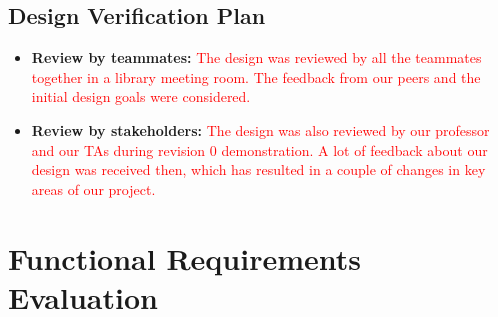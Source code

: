\documentclass[12pt, titlepage]{article}
\begin{document}
\subsection{Design Verification Plan}
\begin{itemize}
  \item \textbf{Review by teammates:} \textcolor{red}{The design was reviewed by all the teammates together in a library meeting room. The feedback from our peers and the initial design goals were considered.}
  \item \textbf{Review by stakeholders:} \textcolor{red}{The design was also reviewed by our professor and our TAs during revision 0 demonstration. A lot of feedback about our design was received then, which has resulted in a couple of changes in key areas of our project. 
  } 
\end{itemize}

\section{Functional Requirements Evaluation}
\end{document}
